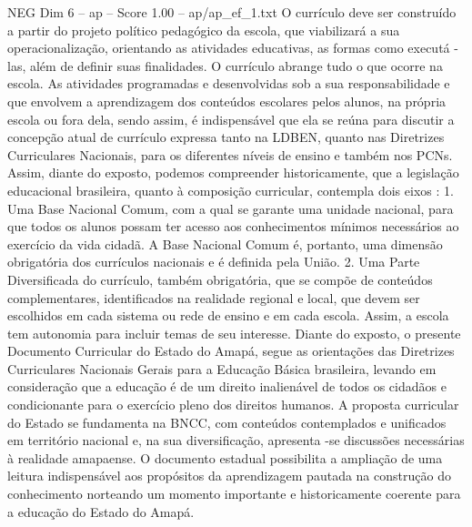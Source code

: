 \begin{textsample}{NEG Dim 6 – ap – Score 1.00 – ap/ap\_ef\_1.txt}
O currículo deve ser construído a partir do projeto político pedagógico da escola, que viabilizará a sua operacionalização, orientando as atividades educativas, as formas como executá -las, além de definir suas finalidades.
O currículo abrange tudo o que ocorre na escola.
As atividades programadas e desenvolvidas sob a sua responsabilidade e que envolvem a aprendizagem dos conteúdos escolares pelos alunos, na própria escola ou fora dela, sendo assim, é indispensável que ela se reúna para discutir a concepção atual de currículo expressa tanto na LDBEN, quanto nas Diretrizes Curriculares Nacionais, para os diferentes níveis de ensino e também nos PCNs.
Assim, diante do exposto, podemos compreender historicamente, que a legislação educacional brasileira, quanto à composição curricular, contempla dois eixos : 1.
Uma Base Nacional Comum, com a qual se garante uma unidade nacional, para que todos os alunos possam ter acesso aos conhecimentos mínimos necessários ao exercício da vida cidadã.
A Base Nacional Comum é, portanto, uma dimensão obrigatória dos currículos nacionais e é definida pela União. 2.
Uma Parte Diversificada do currículo, também obrigatória, que se compõe de conteúdos complementares, identificados na realidade regional e local, que devem ser escolhidos em cada sistema ou rede de ensino e em cada escola.
Assim, a escola tem autonomia para incluir temas de seu interesse.
Diante do exposto, o presente Documento Curricular do Estado do Amapá, segue as orientações das Diretrizes Curriculares Nacionais Gerais para a Educação Básica brasileira, levando em consideração que a educação é de um direito inalienável de todos os cidadãos e condicionante para o exercício pleno dos direitos humanos.
A proposta curricular do Estado se fundamenta na BNCC, com conteúdos contemplados e unificados em território nacional e, na sua diversificação, apresenta -se discussões necessárias à realidade amapaense.
O documento estadual possibilita a ampliação de uma leitura indispensável aos propósitos da aprendizagem pautada na construção do conhecimento norteando um momento importante e historicamente coerente para a educação do Estado do Amapá.

\end{textsample}
